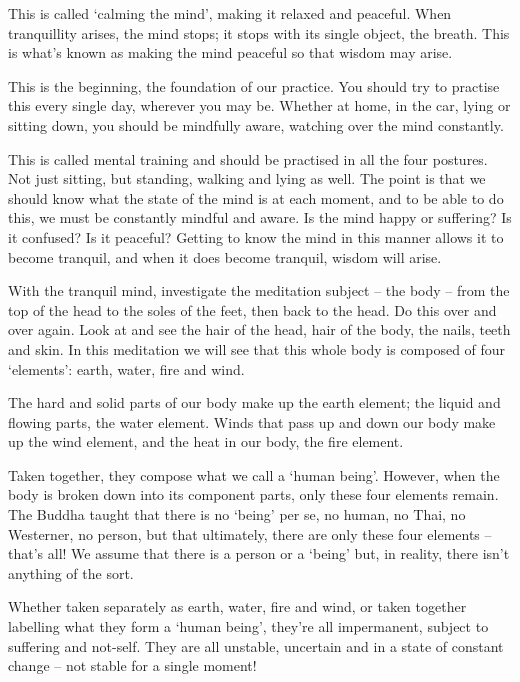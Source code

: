 This is called `calming the mind', making it relaxed and peaceful. When tranquillity arises, the mind stops; it stops with its single object, the breath. This is what's known as making the mind peaceful so that wisdom may arise.

This is the beginning, the foundation of our practice. You should try to practise this every single day, wherever you may be. Whether at home, in the car, lying or sitting down, you should be mindfully aware, watching over the mind constantly.

This is called mental training and should be practised in all the four postures. Not just sitting, but standing, walking and lying as well. The point is that we should know what the state of the mind is at each moment, and to be able to do this, we must be constantly mindful and aware. Is the mind happy or suffering? Is it confused? Is it peaceful? Getting to know the mind in this manner allows it to become tranquil, and when it does become tranquil, wisdom will arise.

With the tranquil mind, investigate the meditation subject -- the body -- from the top of the head to the soles of the feet, then back to the head. Do this over and over again. Look at and see the hair of the head, hair of the body, the nails, teeth and skin. In this meditation we will see that this whole body is composed of four `elements': earth, water, fire and wind.

The hard and solid parts of our body make up the earth element; the liquid and flowing parts, the water element. Winds that pass up and down our body make up the wind element, and the heat in our body, the fire element.

Taken together, they compose what we call a `human being'. However, when the body is broken down into its component parts, only these four elements remain. The Buddha taught that there is no `being' per se, no human, no Thai, no Westerner, no person, but that ultimately, there are only these four elements -- that's all! We assume that there is a person or a `being' but, in reality, there isn't anything of the sort.

Whether taken separately as earth, water, fire and wind, or taken together labelling what they form a `human being', they're all impermanent, subject to suffering and not-self. They are all unstable, uncertain and in a state of constant change -- not stable for a single moment!

